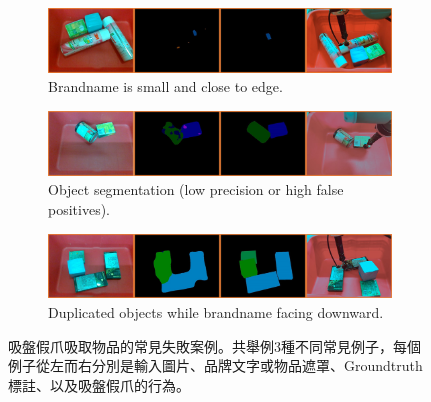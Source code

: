 \begin{figure}
  \centering
  \begin{subfigure}[b]{0.45\textwidth}
    \includegraphics[width=\textwidth]{./figures/5_obj_8_suction_fail_2.jpg}
    \caption{Brandname is small and close to edge.}
    \label{fig:cylinder_suction_fail}
  \end{subfigure}
  \begin{subfigure}[b]{0.45\textwidth}
    \includegraphics[width=\textwidth]{./figures/5_obj_13_suction_fail_3.jpg}
    \caption{Object segmentation (low precision or high false positives).}
    \label{fig:cuboid_suction_fail}
  \end{subfigure}
  \begin{subfigure}[b]{0.45\textwidth}
    \includegraphics[width=\textwidth]{./figures/5_obj_14_suction_fail_1.jpg}
    \caption{Duplicated objects while brandname facing downward.}
    \label{fig:adjacent_suction_fail}
  \end{subfigure}
  \caption{吸盤假爪吸取物品的常見失敗案例。共舉例3種不同常見例子，每個例子從左而右分別是輸入圖片、品牌文字或物品遮罩、Groundtruth標註、以及吸盤假爪的行為。
}
  \label{fig:failure}
\end{figure}

